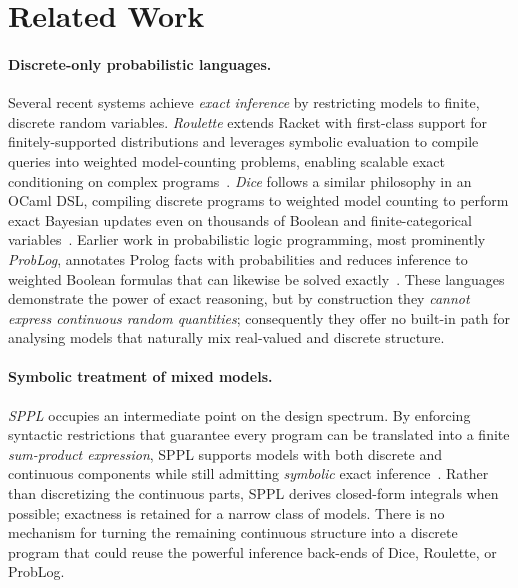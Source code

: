 \section{Related Work}
\label{sec:related}

\paragraph{Discrete-only probabilistic languages.}  
Several recent systems achieve \emph{exact inference} by restricting models to finite, discrete random variables. \emph{Roulette} extends Racket with first-class support for finitely-supported distributions and leverages symbolic evaluation to compile queries into weighted model-counting problems, enabling scalable exact conditioning on complex programs~\cite{Moy2025Roulette}. \emph{Dice} follows a similar philosophy in an OCaml DSL, compiling discrete programs to weighted model counting to perform exact Bayesian updates even on thousands of Boolean and finite-categorical variables~\cite{Holtzen2020Dice}. Earlier work in probabilistic logic programming, most prominently \emph{ProbLog}, annotates Prolog facts with probabilities and reduces inference to weighted Boolean formulas that can likewise be solved exactly~\cite{DeRaedt2007ProbLog}. These languages demonstrate the power of exact reasoning, but by construction they \emph{cannot express continuous random quantities}; consequently they offer no built-in path for analysing models that naturally mix real-valued and discrete structure.  

\paragraph{Symbolic treatment of mixed models.}  
\emph{SPPL} occupies an intermediate point on the design spectrum. By enforcing syntactic restrictions that guarantee every program can be translated into a finite \emph{sum-product expression}, SPPL supports models with both discrete and continuous components while still admitting \emph{symbolic} exact inference~\cite{Saad2021SPPL}. Rather than discretizing the continuous parts, SPPL derives closed-form integrals when possible; exactness is retained for a narrow class of models. There is no mechanism for turning the remaining continuous structure into a discrete program that could reuse the powerful inference back-ends of Dice, Roulette, or ProbLog.

